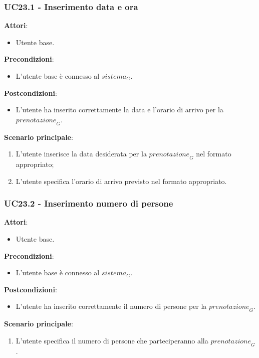 \subsubsection{UC23.1 - Inserimento data e ora}\label{usecase:23_1}
\textbf{Attori}:
\begin{itemize}
    \item Utente base.
\end{itemize}
\textbf{Precondizioni}:
\begin{itemize}
    \item L'utente base è connesso al $\textit{sistema}_G$.
\end{itemize}
\textbf{Postcondizioni}:
\begin{itemize}
    \item L'utente ha inserito correttamente la data e l'orario di arrivo per la $\textit{prenotazione}_G$.
\end{itemize}
\textbf{Scenario principale}:
\begin{enumerate}
    \item L'utente inserisce la data desiderata per la $\textit{prenotazione}_G$ nel formato appropriato;
    \item L'utente specifica l'orario di arrivo previsto nel formato appropriato.
\end{enumerate}



\subsubsection{UC23.2 - Inserimento numero di persone}\label{usecase:23_2}
\textbf{Attori}:
\begin{itemize}
    \item Utente base.
\end{itemize}
\textbf{Precondizioni}:
\begin{itemize}
    \item L'utente base è connesso al $\textit{sistema}_G$.
\end{itemize}
\textbf{Postcondizioni}:
\begin{itemize}
    \item L'utente ha inserito correttamente il numero di persone per la $\textit{prenotazione}_G$.
\end{itemize}
\textbf{Scenario principale}:
\begin{enumerate}
    \item L'utente specifica il numero di persone che parteciperanno alla $\textit{prenotazione}_G$.
\end{enumerate}



